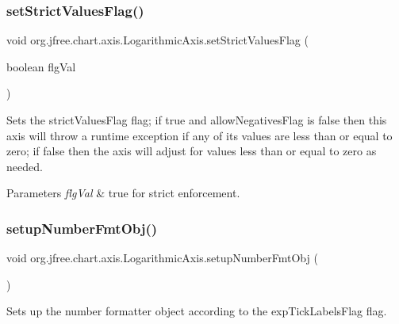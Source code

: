 \subsubsection{\texorpdfstring{set\+Strict\+Values\+Flag()}{setStrictValuesFlag()}}
{\footnotesize\ttfamily void org.\+jfree.\+chart.\+axis.\+Logarithmic\+Axis.\+set\+Strict\+Values\+Flag (\begin{DoxyParamCaption}\item[{boolean}]{flg\+Val }\end{DoxyParamCaption})}

Sets the \textquotesingle{}strict\+Values\+Flag\textquotesingle{} flag; if true and \textquotesingle{}allow\+Negatives\+Flag\textquotesingle{} is false then this axis will throw a runtime exception if any of its values are less than or equal to zero; if false then the axis will adjust for values less than or equal to zero as needed.


\begin{DoxyParams}{Parameters}
{\em flg\+Val} & true for strict enforcement. \\
\hline
\end{DoxyParams}
\mbox{\label{classorg_1_1jfree_1_1chart_1_1axis_1_1_logarithmic_axis_ae2e80ae7c1b256f982b6c4b0f814dbe4}} 
\subsubsection{\texorpdfstring{setup\+Number\+Fmt\+Obj()}{setupNumberFmtObj()}}
{\footnotesize\ttfamily void org.\+jfree.\+chart.\+axis.\+Logarithmic\+Axis.\+setup\+Number\+Fmt\+Obj (\begin{DoxyParamCaption}{ }\end{DoxyParamCaption})\hspace{0.3cm}{\ttfamily [protected]}}

Sets up the number formatter object according to the \textquotesingle{}exp\+Tick\+Labels\+Flag\textquotesingle{} flag. \mbox{\label{classorg_1_1jfree_1_1chart_1_1axis_1_1_logarithmic_axis_ad306f365f02d8ae244de783b086f056e}} 
